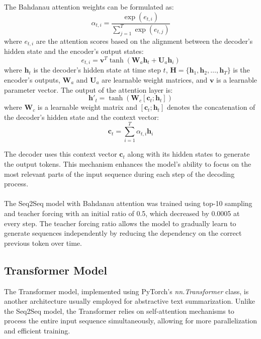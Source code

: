 The Bahdanau attention weights can be formulated as:
\begin{equation}
    \alpha_{t,i} = \frac{\exp(e_{t,i})}{\sum_{j=1}^{T} \exp(e_{t,j})}
\end{equation}
where \( e_{t,i}\) are the attention scores based on the alignment between the decoder's hidden state and the encoder's output states:
\begin{equation}
    e_{t,i} = \mathbf{v}^T \tanh(\mathbf{W}_a \mathbf{h}_t + \mathbf{U}_a \mathbf{h}_i)
\end{equation}
where \( \mathbf{h}_t \) is the decoder's hidden state at time step \( t \), \( \mathbf{H} = \{\mathbf{h}_1, \mathbf{h}_2, \ldots, \mathbf{h}_T\} \) is the encoder's outputs, \( \mathbf{W}_a \) and \( \mathbf{U}_a \) are learnable weight matrices, and \( \mathbf{v} \) is a learnable parameter vector.
The output of the attention layer is:
\begin{equation}
    \mathbf{h}'_t = \tanh(\mathbf{W}_c [\mathbf{c}_t ; \mathbf{h}_t])
\end{equation}
where \( \mathbf{W}_c \) is a learnable weight matrix and \( [\mathbf{c}_t ; \mathbf{h}_t] \) denotes the concatenation of the decoder's hidden state and the context vector:
\begin{equation}
    \mathbf{c}_t = \sum_{i=1}^{T} \alpha_{t,i} \mathbf{h}_i
\end{equation}

The decoder uses this context vector \( \mathbf{c}_t \) along with its hidden states to generate the output tokens. This mechanism enhances the model's ability to focus on the most relevant parts of the input sequence during each step of the decoding process.

\paragraph{}
The Seq2Seq model with Bahdanau attention was trained using top-10 sampling and teacher forcing with an initial ratio of 0.5, which decreased by 0.0005 at every step. The teacher forcing ratio allows the model to gradually learn to generate sequences independently by reducing the dependency on the correct previous token over time.

\subsection{Transformer Model}

The Transformer model\cite{vaswani2017attention}, implemented using PyTorch's \textit{nn.Transformer} class\cite{transformer}, is another architecture usually employed for abstractive text summarization. Unlike the Seq2Seq model, the Transformer relies on self-attention mechanisms to process the entire input sequence simultaneously, allowing for more parallelization and efficient training.

